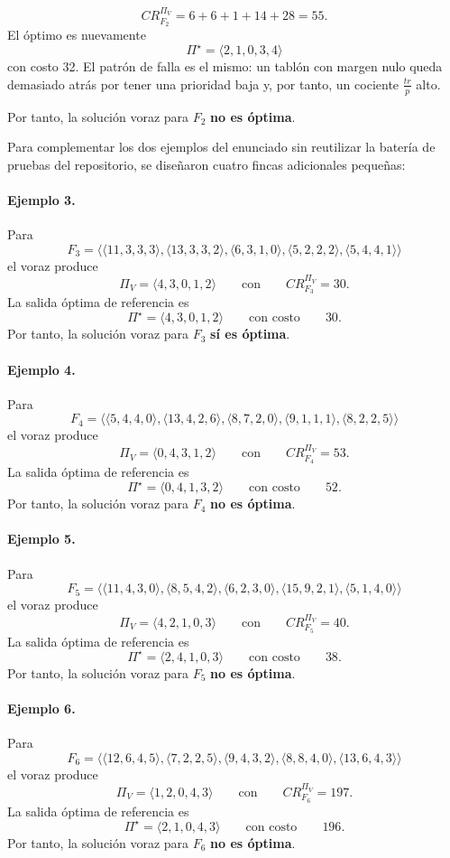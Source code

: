\documentclass[12pt,a4paper]{article}
\begin{document}
\[
CR_{F_2}^{\Pi_V}=6+6+1+14+28=55.
\]
El \'optimo es nuevamente
\[
\Pi^\star=\langle 2,1,0,3,4\rangle
\]
con costo 32. El patr\'on de falla es el mismo: un tabl\'on con margen nulo queda demasiado atr\'as por tener una prioridad baja y, por tanto, un cociente \(\frac{tr}{p}\) alto.

Por tanto, la soluci\'on voraz para \(F_2\) \textbf{no es \'optima}.

Para complementar los dos ejemplos del enunciado sin reutilizar la bater\'ia de pruebas del repositorio, se dise\~naron cuatro fincas adicionales peque\~nas:

\paragraph{Ejemplo 3.}
Para
\[
F_3=\langle\langle 11,3,3,3\rangle,\langle 13,3,3,2\rangle,\langle 6,3,1,0\rangle,\langle 5,2,2,2\rangle,\langle 5,4,4,1\rangle\rangle
\]
el voraz produce
\[
\Pi_V=\langle 4,3,0,1,2\rangle
\qquad\text{con}\qquad
CR_{F_3}^{\Pi_V}=30.
\]
La salida \'optima de referencia es
\[
\Pi^\star=\langle 4,3,0,1,2\rangle
\qquad\text{con costo}\qquad
30.
\]
Por tanto, la soluci\'on voraz para \(F_3\) \textbf{s\'i es \'optima}.

\paragraph{Ejemplo 4.}
Para
\[
F_4=\langle\langle 5,4,4,0\rangle,\langle 13,4,2,6\rangle,\langle 8,7,2,0\rangle,\langle 9,1,1,1\rangle,\langle 8,2,2,5\rangle\rangle
\]
el voraz produce
\[
\Pi_V=\langle 0,4,3,1,2\rangle
\qquad\text{con}\qquad
CR_{F_4}^{\Pi_V}=53.
\]
La salida \'optima de referencia es
\[
\Pi^\star=\langle 0,4,1,3,2\rangle
\qquad\text{con costo}\qquad
52.
\]
Por tanto, la soluci\'on voraz para \(F_4\) \textbf{no es \'optima}.

\paragraph{Ejemplo 5.}
Para
\[
F_5=\langle\langle 11,4,3,0\rangle,\langle 8,5,4,2\rangle,\langle 6,2,3,0\rangle,\langle 15,9,2,1\rangle,\langle 5,1,4,0\rangle\rangle
\]
el voraz produce
\[
\Pi_V=\langle 4,2,1,0,3\rangle
\qquad\text{con}\qquad
CR_{F_5}^{\Pi_V}=40.
\]
La salida \'optima de referencia es
\[
\Pi^\star=\langle 2,4,1,0,3\rangle
\qquad\text{con costo}\qquad
38.
\]
Por tanto, la soluci\'on voraz para \(F_5\) \textbf{no es \'optima}.

\paragraph{Ejemplo 6.}
Para
\[
F_6=\langle\langle 12,6,4,5\rangle,\langle 7,2,2,5\rangle,\langle 9,4,3,2\rangle,\langle 8,8,4,0\rangle,\langle 13,6,4,3\rangle\rangle
\]
el voraz produce
\[
\Pi_V=\langle 1,2,0,4,3\rangle
\qquad\text{con}\qquad
CR_{F_6}^{\Pi_V}=197.
\]
La salida \'optima de referencia es
\[
\Pi^\star=\langle 2,1,0,4,3\rangle
\qquad\text{con costo}\qquad
196.
\]
Por tanto, la soluci\'on voraz para \(F_6\) \textbf{no es \'optima}.
\end{document}
